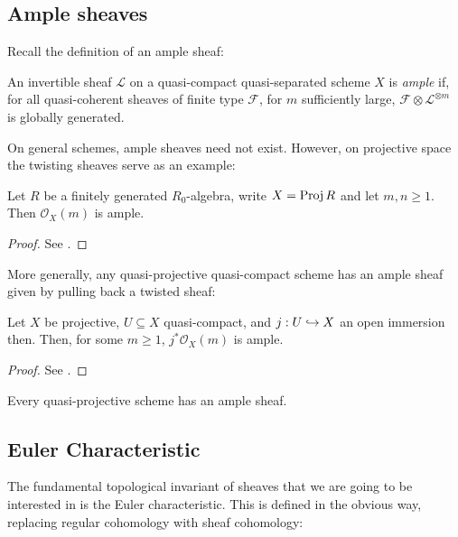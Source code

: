 \documentclass[12pt]{ociamthesis}  %
\begin{document}
\subsection{Ample sheaves}

Recall the definition of an ample sheaf:

\begin{definition}
  An invertible sheaf $\mathcal L$ on a quasi-compact quasi-separated
  scheme $X$ is \emph{ample} if, for all quasi-coherent sheaves of
  finite type $\mathcal F$, for $m$ sufficiently large,
  $\mathcal F\otimes \mathcal L^{\otimes m}$ is
  globally generated.
\end{definition}

On general schemes, ample sheaves need not exist. However, on
projective space the twisting sheaves serve as an example:

\begin{proposition}
  Let $R$ be a finitely generated $R_0$-algebra,
  write $X=\operatorname{Proj} R$ and let $m,n\geq 1$. Then
  $\mathcal O_X(m)$ is ample.
  \begin{proof}
    See \cite[Example 13.45]{gortz2010}.
  \end{proof}
\end{proposition}

More generally, any quasi-projective quasi-compact scheme has
an ample sheaf given by pulling back a twisted sheaf:

\begin{proposition}
  Let $X$ be projective, $U\subseteq X$ quasi-compact, and
  $j : U \hookrightarrow X$ an open immersion then. Then, for some $m\geq 1$,
  $j^*\mathcal O_X(m)$ is ample.
  \begin{proof}
    See \cite[\href{https://stacks.math.columbia.edu/tag/01Q2}{Tag 01Q2}]{stacks-project}.
  \end{proof}
\end{proposition}

\begin{corollary}
  Every quasi-projective scheme has an ample sheaf.
\end{corollary}


\subsection{Euler Characteristic}

The fundamental topological invariant of sheaves that we are going
to be interested in is the Euler characteristic. This is defined
in the obvious way, replacing regular cohomology with sheaf
cohomology:
\end{document}
